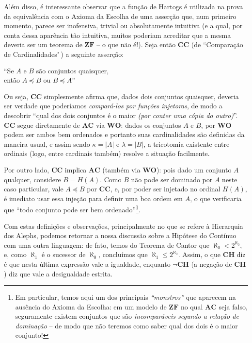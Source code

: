 \documentclass{hipatia}
\newcommand{\ch}{\mathbf{CH}}
\newcommand{\wo}{\mathbf{WO}}
\newcommand{\ac}{\mathbf{AC}}
\newcommand{\zf}{\mathbf{ZF}}
\newcommand{\dominado}{\preccurlyeq}
\begin{document}
Além disso, é interessante observar que a função de Hartogs
é utilizada na prova da equivalência com o Axioma da Escolha
de uma asserção que, num primeiro momento, parece ser
inofensiva, trivial ou absolutamente intuitiva (e a qual,
por conta dessa aparência tão intuitiva, muitos poderiam
acreditar que a mesma deveria ser um teorema de $\zf$ -- o
que não é!). Seja então $\mathbf{CC}$ (de ``Comparação de
Cardinalidades"\,) a seguinte asserção:

\begin{center}

	``Se $A$ e $B$ são conjuntos quaisquer, \\
	então $A \dominado B$ ou $B \dominado A$''

\end{center}

Ou seja, $\mathbf{CC}$ simplesmente afirma que, dados dois
conjuntos quaisquer, deveria ser verdade que poderíamos {\it
compará-los por funções injetoras}, de modo a descobrir
``qual dos dois conjuntos é o maior {\it (por conter uma
cópia do outro)}''. $\mathbf{CC}$ segue diretamente de $\ac$
via $\wo$: dados os conjuntos $A$ e $B$, por $\mathbf{WO}$
podem ser ambos bem ordenados e portanto suas cardinalidades
são definidas da maneira usual,  e assim sendo $\kappa =
|A|$ e $\lambda = |B|$, a tricotomia existente entre
ordinais (logo, entre cardinais também) resolve a situação
facilmente. 

Por outro lado, $\mathbf{CC}$ implica $\ac$ (também via
$\wo$): pois dado um conjunto $A$ qualquer, considere $B =
H(A)$. Como $B$ não pode ser dominado por $A$ neste caso
particular, vale $A \dominado B$ por $\mathbf{CC}$, e, por
poder ser injetado no ordinal $H(A)$, é imediato usar essa
injeção para definir uma boa ordem em $A$, o que verificaria
que ``todo conjunto pode ser bem ordenado''\footnote{Em
particular, temos aqui um dos principais {\it ``monstros''}
que aparecem na ausência do Axioma da Escolha: em um modelo
de $\zf$ no qual $\ac$ seja falso, seguramente existem
conjuntos que são {\it incomparáveis segundo a relação de
dominação} -- de modo que não teremos como saber qual dos
dois é o maior conjunto!}. 

Com estas definições e observações, principalmente no que se
refere à Hierarquia dos Alephs,  podemos retornar a nossa
discussão sobre a Hipótese do Contínuo com uma outra
linguagem: de fato, temos do Teorema de Cantor que
$\aleph_0<2^{\aleph_0}$, e, como $\aleph_1$ é o sucessor de
$\aleph_0$, concluímos que $\aleph_1\leq2^{\aleph_0}$.
Assim, o que $\ch$ diz é que nesta última expressão vale a
igualdade, enquanto $\neg\ch$ (a negação de $\ch$) diz que
vale a desigualdade estrita.
\end{document}
